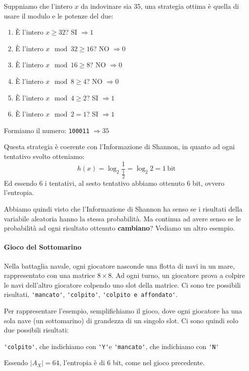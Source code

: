 Suppniamo che l'intero $x$ da indovinare sia 35, una strategia ottima è quella di usare il modulo e le potenze del due:
\begin{enumerate}
	\item È l'intero $x \geq 32$? SI $\Rightarrow 1$
	\item È l'intero $x \mod{32} \geq 16$? NO $\Rightarrow 0$
	\item È l'intero $x \mod{16} \geq 8$? NO $\Rightarrow 0$
	\item È l'intero $x \mod{8} \geq 4$? NO $\Rightarrow 0$
	\item È l'intero $x \mod{4} \geq 2$? SI $\Rightarrow 1$
	\item È l'intero $x \mod{2} = 1$? SI $\Rightarrow 1$
\end{enumerate}

Formiamo il numero: \verb|100011| $\Rightarrow 35$

Questa strategia è coerente con l'Informazione di Shannon, in quanto ad ogni tentativo svolto otteniamo:
$$
h(x) = \log_{2} \frac{1}{\frac{1}{2}} = \log_{2} 2 = 1\ \text{bit}
$$
Ed essendo 6 i tentativi, al sesto tentativo abbiamo ottenuto 6 bit, ovvero l'entropia.

Abbiamo quindi visto che l'Informazione di Shannon ha senso se i risultati della variabile aleatoria hanno la stessa probabilità. Ma continua ad avere senso se le probabilità ad ogni risultato ottenuto \textbf{cambiano}? Vediamo un altro esempio.

\paragraph{Gioco del Sottomarino}
Nella battaglia navale, ogni giocatore nasconde una flotta di navi in un mare, rappresentato con una matrice $8\times8$. Ad ogni turno, un giocatore prova a colpire le navi dell'altro giocatore colpendo uno slot della matrice. Ci sono tre possibili risultati, \verb|'mancato'|, \verb|'colpito'|, \verb|'colpito e affondato'|.

Per rappresentare l'esempio, semplifichiamo il gioco, dove ogni giocatore ha una sola nave (un sottomarino) di grandezza di un singolo slot. Ci sono quindi solo due possibili risultati:
\begin{center}
	\verb|'colpito'|, che indichiamo con \verb|'Y'|\quad e \quad \verb|'mancato'|, che indichiamo con \verb|'N'|
\end{center}

Essendo $|A_X| = 64$, l'entropia è di 6 bit, come nel gioco precedente.

